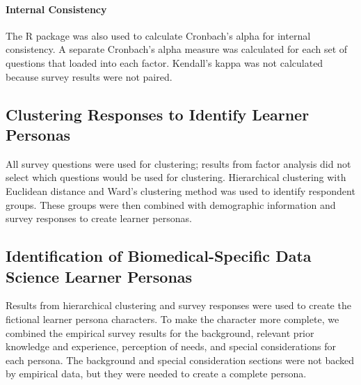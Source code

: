 \documentclass[020-persona\_validation.tex]{subfiles}
\begin{document}
            \paragraph{Internal Consistency}
        
                The  R package was also used to calculate Cronbach's alpha for internal consistency.
                A separate Cronbach's alpha measure was calculated for each set of questions that loaded into each factor.
                Kendall's kappa was not calculated because survey results were not paired.

    \subsection{Clustering Responses to Identify Learner Personas}

        All survey questions were used for clustering;
        results from factor analysis did not select which questions would be used for clustering.
        Hierarchical clustering with Euclidean distance and
        Ward's clustering method was used to identify respondent groups.
        These groups were then combined with demographic information and survey responses to create learner personas.

    \subsection{Identification of Biomedical-Specific Data Science Learner Personas}

        Results from hierarchical clustering and survey responses were used to create the
        fictional learner persona characters.
        To make the character more complete,
        we combined the empirical survey results for the
        background,
        relevant prior knowledge and experience,
        perception of needs,
        and special considerations
        for each persona.
        The background and special consideration sections were not backed by empirical data,
        but they were needed to create a complete persona.
\end{document}
